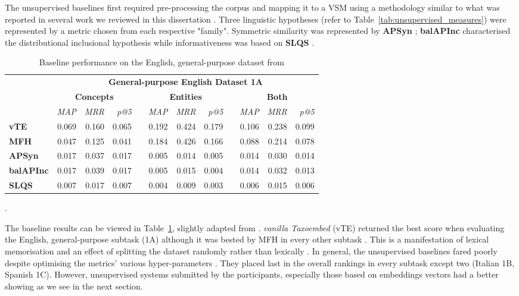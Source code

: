 The unsupervised baselines first required pre-processing the corpus and mapping it to a \ac{VSM} using a methodology similar to what was reported in several work we reviewed in this dissertation \citep{shwartz2017siege, santus2014chasing, roller2014inclusive}.  Three linguistic hypotheses (refer to Table~\ref{tab:unsupervised_measures}) were represented by a metric chosen from each respective "family". Symmetric similarity was represented by \textbf{APSyn} \citep{santus2016unsupervised}; \textbf{balAPInc} \citep{kotlerman2010directional} characterised the distributional inclusional hypothesis while informativeness was based on \textbf{SLQS} \citep{santus2014chasing}.

\begin{table}\centering
    \begin{tabular}{@{}lrrrcrrrcrrr@{}} \toprule
    & \multicolumn{11}{c}{\textbf{General-purpose English Dataset 1A}} \\
    \cmidrule{2-12}
    & \multicolumn{3}{c}{\textbf{Concepts}} & \phantom{a} & \multicolumn{3}{c}{\textbf{Entities}} & \phantom{a} & \multicolumn{3}{c}{\textbf{Both}} \\ 
    \cmidrule{2-4} \cmidrule{6-8} \cmidrule{10-12}
    & \textit{MAP} & \textit{MRR} & \textit{p@5} && 
      \textit{MAP} & \textit{MRR} & \textit{p@5} && 
      \textit{MAP} & \textit{MRR} & \textit{p@5} \\  \midrule
    \textbf{vTE} & 0.069 & 0.160 & 0.065 && 0.192 & 0.424 & 0.179 && 0.106 & 0.238 & 0.099 \\
    \textbf{MFH} & 0.047 & 0.125 & 0.041 && 0.184 & 0.426 & 0.166 && 0.088 & 0.214 & 0.078 \\
    \textbf{APSyn} & 0.017 & 0.037 & 0.017 && 0.005 & 0.014 & 0.005 && 0.014 & 0.030 & 0.014 \\
    \textbf{balAPInc} & 0.017 & 0.039 & 0.017 && 0.005 & 0.015 & 0.004 && 0.014 & 0.032 & 0.013 \\
    \textbf{SLQS} & 0.007 & 0.017 & 0.007 && 0.004 & 0.009 & 0.003 && 0.006 & 0.015 & 0.006 \\
    \bottomrule
    \end{tabular}
    \caption{Baseline performance on the English, general-purpose dataset from \citep{camacho2018semeval}}.\label{tab:semeval_baseline}
\end{table}

The baseline results can be viewed in Table~\ref{tab:semeval_baseline}, slightly adapted from \citep{camacho2018semeval}.  \textit{vanilla Taxoembed} (vTE) returned the best score when evaluating the English, general-purpose subtask (1A) although it was bested by \ac{MFH} in every other subtask \citep{camacho2018semeval}.  This is a manifestation of lexical memorisation and an effect of splitting the dataset randomly rather than lexically \citep{levy2014dependency}.  In general, the unsupervised baselines fared poorly despite optimising the metrics' various hyper-parameters \citep{camacho2018semeval}.  They placed last in the overall rankings in every subtask except two (Italian 1B, Spanish 1C).  However, unsupervised systems submitted by the participants, especially those based on embeddings vectors had a better showing as we see in the next section.

